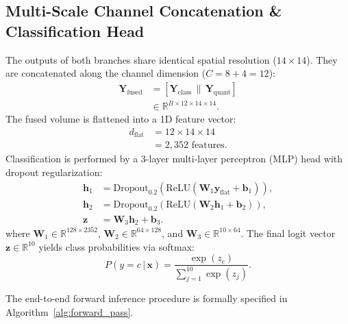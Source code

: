 \documentclass[journal]{IEEEtran}
\begin{document}
\subsection{Multi-Scale Channel Concatenation \& Classification Head}
The outputs of both branches share identical spatial resolution ($14 \times 14$). They are concatenated along the channel dimension ($C = 8 + 4 = 12$):
\begin{align}
\mathbf{Y}_{\mathrm{fused}} &= \left[ \mathbf{Y}_{\mathrm{class}} \,\|\, \mathbf{Y}_{\mathrm{quant}} \right] \nonumber \\
&\in \mathbb{R}^{B \times 12 \times 14 \times 14}.
\label{eq:channel_concat}
\end{align}
The fused volume is flattened into a 1D feature vector:
\begin{align}
d_{\mathrm{flat}} &= 12 \times 14 \times 14 \nonumber \\
&= 2{,}352 \text{ features}.
\label{eq:flatten_dim}
\end{align}
Classification is performed by a 3-layer multi-layer perceptron (MLP) head with dropout regularization:
\begin{align}
\mathbf{h}_1 &= \mathrm{Dropout}_{0.2}(\mathrm{ReLU}(\mathbf{W}_1 \mathbf{y}_{\mathrm{flat}} + \mathbf{b}_1)), \nonumber \\
\mathbf{h}_2 &= \mathrm{Dropout}_{0.2}(\mathrm{ReLU}(\mathbf{W}_2 \mathbf{h}_1 + \mathbf{b}_2)), \nonumber \\
\mathbf{z} &= \mathbf{W}_3 \mathbf{h}_2 + \mathbf{b}_3.
\label{eq:dense_head}
\end{align}
where $\mathbf{W}_1 \in \mathbb{R}^{128 \times 2352}$, $\mathbf{W}_2 \in \mathbb{R}^{64 \times 128}$, and $\mathbf{W}_3 \in \mathbb{R}^{10 \times 64}$. The final logit vector $\mathbf{z} \in \mathbb{R}^{10}$ yields class probabilities via softmax:
\begin{equation}
P(y = c \,|\, \mathbf{x}) = \frac{\exp(z_c)}{\sum_{j=1}^{10} \exp(z_j)}.
\label{eq:softmax}
\end{equation}

The end-to-end forward inference procedure is formally specified in Algorithm~\ref{alg:forward_pass}.
\end{document}
